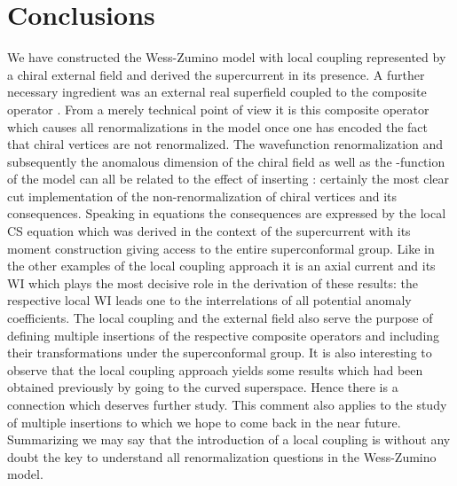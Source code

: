 \documentclass[a4paper,12pt]{article}
\begin{document}
\section{Conclusions}
\setcounter{equation}{0}
We have constructed the Wess-Zumino model with local coupling represented
by a chiral external field \myHighlight{${\Lambda}$}\coordHE{} and derived
the supercurrent in its presence. A further necessary ingredient was an external
real superfield \coordHE{} coupled to the composite operator \coordHE{}. From a
merely technical point of view it is this composite operator which causes
all renormalizations in the model once one has encoded the fact that
chiral vertices are not renormalized. The wavefunction renormalization
and subsequently the anomalous dimension of the chiral field \coordHE{} as well as
the \myHighlight{$\beta$}\coordHE{}-function of the model can all be related to the effect of inserting
\coordHE{}: certainly the most clear cut implementation of the
non-renormalization of chiral vertices and its consequences. Speaking in
equations the consequences are expressed by the local CS equation which
was derived in the context
of the supercurrent with its moment construction giving access to the
entire superconformal group. Like in the other examples of the local
coupling approach it is an axial current  and its WI which plays the most
decisive role in the derivation of these results: the respective local
WI leads one to the interrelations of all potential anomaly coefficients.
The local coupling and the external field \coordHE{} also serve the purpose
of defining multiple insertions of the respective composite operators
\coordHE{} and \coordHE{} including their transformations under the superconformal
group. It is also interesting to observe that the local coupling approach
yields some results which had been obtained previously by going to the curved
superspace. Hence there is a connection which deserves further study.
This comment also applies to the study of multiple insertions to which we hope to
come back in the near future. Summarizing we may say that the introduction
of a local coupling is without any doubt the key to understand all
renormalization questions in the Wess-Zumino model.
\end{document}
